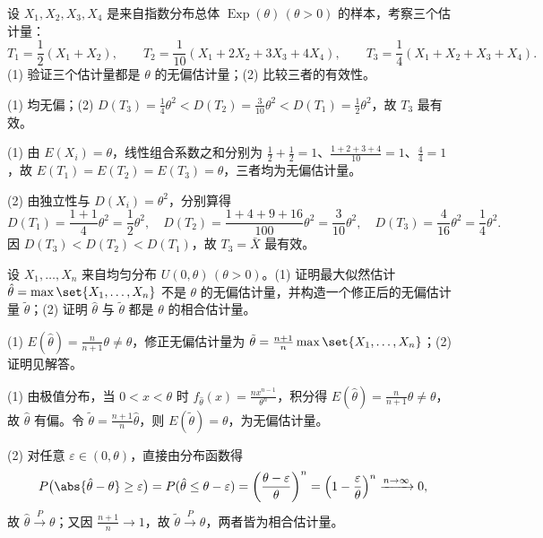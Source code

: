 \begin{exercise}
设 $X_1,X_2,X_3,X_4$ 是来自指数分布总体 $\operatorname{Exp}(\theta)\,(\theta>0)$ 的样本，考察三个估计量：
\[
  T_1=\frac{1}{2}(X_1+X_2),\qquad
  T_2=\frac{1}{10}(X_1+2X_2+3X_3+4X_4),\qquad
  T_3=\frac{1}{4}(X_1+X_2+X_3+X_4).
\]
(1) 验证三个估计量都是 $\theta$ 的无偏估计量；(2) 比较三者的有效性。
\begin{answer}
(1) 均无偏；(2) $D(T_3)=\frac{1}{4}\theta^2<D(T_2)=\frac{3}{10}\theta^2<D(T_1)=\frac{1}{2}\theta^2$，故 $T_3$ 最有效。
\end{answer}
\begin{solution}
(1) 由 $E(X_i)=\theta$，线性组合系数之和分别为 $\frac{1}{2}+\frac{1}{2}=1$、$\frac{1+2+3+4}{10}=1$、$\frac{4}{4}=1$，故 $E(T_1)=E(T_2)=E(T_3)=\theta$，三者均为无偏估计量。

(2) 由独立性与 $D(X_i)=\theta^2$，分别算得
\[
  D(T_1)=\frac{1+1}{4}\theta^2=\frac{1}{2}\theta^2,\quad
  D(T_2)=\frac{1+4+9+16}{100}\theta^2=\frac{3}{10}\theta^2,\quad
  D(T_3)=\frac{4}{16}\theta^2=\frac{1}{4}\theta^2.
\]
因 $D(T_3)<D(T_2)<D(T_1)$，故 $T_3=\bar{X}$ 最有效。
\end{solution}
\end{exercise}

\begin{exercise}
设 $X_1,\ldots,X_n$ 来自均匀分布 $U(0,\theta)\,(\theta>0)$。(1) 证明最大似然估计 $\hat{\theta}=\max\set{X_1,\ldots,X_n}$ 不是 $\theta$ 的无偏估计量，并构造一个修正后的无偏估计量 $\tilde{\theta}$；(2) 证明 $\hat{\theta}$ 与 $\tilde{\theta}$ 都是 $\theta$ 的相合估计量。
\begin{answer}
(1) $E(\hat{\theta})=\frac{n}{n+1}\theta\ne\theta$，修正无偏估计量为 $\tilde{\theta}=\frac{n+1}{n}\max\set{X_1,\ldots,X_n}$；(2) 证明见解答。
\end{answer}
\begin{solution}
(1) 由极值分布，当 $0<x<\theta$ 时 $f_{\hat{\theta}}(x)=\frac{n x^{n-1}}{\theta^n}$，积分得 $E(\hat{\theta})=\frac{n}{n+1}\theta\ne\theta$，故 $\hat{\theta}$ 有偏。令 $\tilde{\theta}=\frac{n+1}{n}\hat{\theta}$，则 $E(\tilde{\theta})=\theta$，为无偏估计量。

(2) 对任意 $\varepsilon\in(0,\theta)$，直接由分布函数得
\[
  P\bigl(\abs{\hat{\theta}-\theta}\ge\varepsilon\bigr)
  =P(\hat{\theta}\le\theta-\varepsilon)
  =\left(\frac{\theta-\varepsilon}{\theta}\right)^n
  =\left(1-\frac{\varepsilon}{\theta}\right)^n\xrightarrow{n\to\infty} 0,
\]
故 $\hat{\theta}\xrightarrow{P}\theta$；又因 $\frac{n+1}{n}\to 1$，故 $\tilde{\theta}\xrightarrow{P}\theta$，两者皆为相合估计量。
\end{solution}
\end{exercise}

